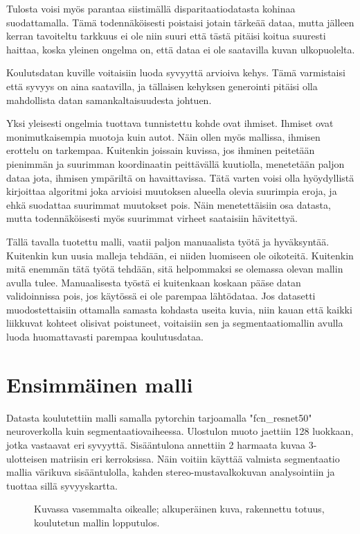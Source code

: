 Tulosta voisi myös parantaa siistimällä disparitaatiodatasta kohinaa suodattamalla.
Tämä todennäköisesti poistaisi jotain tärkeää dataa,
mutta jälleen kerran tavoiteltu tarkkuus ei ole niin suuri että tästä pitäisi koitua suuresti haittaa,
koska yleinen ongelma on, että dataa ei ole saatavilla kuvan ulkopuolelta.

Koulutsdatan kuville voitaisiin luoda syvyyttä arvioiva kehys.
Tämä varmistaisi että syvyys on aina saatavilla, 
ja tällaisen kehyksen generointi pitäisi olla mahdollista datan samankaltaisuudesta johtuen.

Yksi yleisesti ongelmia tuottava tunnistettu kohde ovat ihmiset.
Ihmiset ovat monimutkaisempia muotoja kuin autot.
Näin ollen myös mallissa, ihmisen erottelu on tarkempaa.
Kuitenkin joissain kuvissa,
jos ihminen peitetään pienimmän ja suurimman koordinaatin peittävällä kuutiolla,
menetetään paljon dataa jota, ihmisen ympäriltä on havaittavissa.
Tätä varten voisi olla hyöydyllistä kirjoittaa algoritmi joka arvioisi muutoksen alueella olevia suurimpia eroja,
ja ehkä suodattaa suurimmat muutokset pois. Näin menetettäisiin osa datasta,
mutta todennäköisesti myös suurimmat virheet saataisiin hävitettyä. 

Tällä tavalla tuotettu malli, vaatii paljon manuaalista työtä ja hyväksyntää.
Kuitenkin kun uusia malleja tehdään, ei niiden luomiseen ole oikoteitä.
Kuitenkin mitä enemmän tätä työtä tehdään,
sitä helpommaksi se olemassa olevan mallin avulla tulee.
Manuaalisesta työstä ei kuitenkaan koskaan pääse datan validoinnissa pois,
jos käytössä ei ole parempaa lähtödataa.
Jos datasetti muodostettaisiin ottamalla samasta kohdasta useita kuvia,
niin kauan että kaikki liikkuvat kohteet olisivat poistuneet,
voitaisiin sen ja segmentaatiomallin avulla luoda huomattavasti parempaa koulutusdataa. 

\section{Ensimmäinen malli}

Datasta koulutettiin malli samalla pytorchin tarjoamalla "fcn\_resnet50" \cite{pytorchfcnresnet50} neuroverkolla kuin segmentaatiovaiheessa.
Ulostulon muoto jaettiin 128 luokkaan, jotka vastaavat eri syvyyttä.
Sisääntulona annettiin 2 harmaata kuvaa 3-ulotteisen matriisin eri kerroksissa.
Näin voitiin käyttää valmista segmentaatio mallia värikuva sisääntulolla, kahden stereo-mustavalkokuvan analysointiin ja tuottaa sillä syvyyskartta.

\begin{figure}[h]
\centering
{}
\caption{Kuvassa vasemmalta oikealle; alkuperäinen kuva, rakennettu totuus, koulutetun mallin lopputulos.}
\label{fig:model}
\end{figure}



